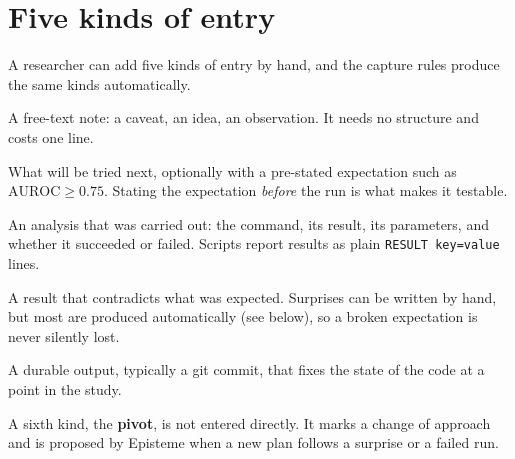 \documentclass[10pt,twocolumn]{article}
\begin{document}
\begin{center}
\end{center}

\section{Five kinds of entry}
A researcher can add five kinds of entry by hand, and the capture rules produce the same kinds automatically.
\begin{description}[style=unboxed,leftmargin=0pt]
  \item[Thought.] A free-text note: a caveat, an idea, an observation. It needs no structure and costs one line.
  \item[Plan.] What will be tried next, optionally with a pre-stated expectation such as
        $\mathrm{AUROC}\ge 0.75$. Stating the expectation \emph{before} the run is what makes it testable.
  \item[Run.] An analysis that was carried out: the command, its result, its parameters, and whether it
        succeeded or failed. Scripts report results as plain \texttt{RESULT key=value} lines.
  \item[Surprise.] A result that contradicts what was expected. Surprises can be written by hand, but most are
        produced automatically (see below), so a broken expectation is never silently lost.
  \item[Artifact.] A durable output, typically a git commit, that fixes the state of the code at a point in
        the study.
\end{description}
A sixth kind, the \textbf{pivot}, is not entered directly. It marks a change of approach and is proposed by
Episteme when a new plan follows a surprise or a failed run.
\end{document}
